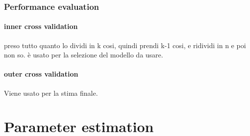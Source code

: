 \subsection{Performance evaluation}
\subsubsection{inner cross validation}
preso tutto quanto lo dividi in k cosi, quindi prendi k-1 cosi, e ridividi in n e poi non so. è usato per la selezione del modello da usare.
\subsubsection{outer cross validation} 
Viene usato per la stima finale. 
\chapter{Parameter estimation}